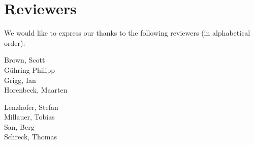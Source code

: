 \section{Reviewers}
\label{section:Reviewers}

We would like to express our thanks to the following reviewers (in alphabetical order):


\vline{}

\begin{minipage}[b]{0.5\linewidth}
\center
Brown, Scott \\
G\"uhring Philipp  \\
Grigg, Ian  \\
Horenbeck, Maarten \\
\end{minipage}
\begin{minipage}[b]{0.5\linewidth}
\center
Lenzhofer, Stefan \\
Millauer, Tobias \\
San, Berg \\
Schreck, Thomas  \\
\end{minipage}



